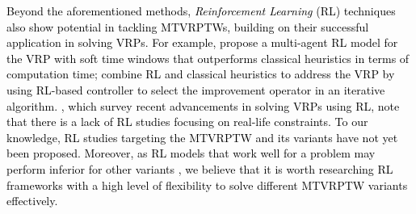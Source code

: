 \documentclass[11pt]{article}
\newcommand\add[1]{\textcolor{black}{#1}}
\begin{document}



\add{Beyond the aforementioned methods, \textit{Reinforcement Learning} (RL) techniques also show potential in tackling MTVRPTWs, building on their successful application in solving VRPs.  For example, \cite{zhang2020multi} propose a multi-agent RL model for the VRP with soft time windows that outperforms classical heuristics in terms of computation time; \cite{lu2020learning} combine RL and classical heuristics to address the VRP by using RL-based controller to select the improvement operator in an iterative algorithm.  \cite{raza2022vehicle}, which survey recent advancements in solving VRPs using RL, note that there is a lack of RL studies focusing on real-life constraints.  To our knowledge, RL studies targeting the MTVRPTW and its variants have not yet been proposed.  Moreover, as RL models that work well for a problem may perform inferior for other variants \citep[see,][]{li2021deep}, we believe that it is worth researching RL frameworks with a high level of flexibility to solve different MTVRPTW variants effectively.}
\end{document}
